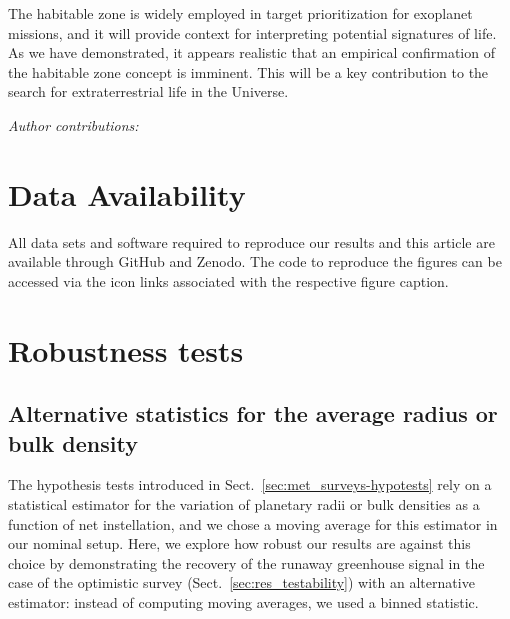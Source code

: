 \documentclass[twocolumn,twocolappendix]{aastex631}
\begin{document}
The habitable zone is widely employed in target prioritization for exoplanet missions, and it will provide context for interpreting potential signatures of life.
As we have demonstrated, it appears realistic that an empirical confirmation of the habitable zone concept is imminent.
This will be a key contribution to the search for extraterrestrial life in the Universe.


\begin{large}\textit{Author contributions:}\end{large}

\section*{Data Availability}
All data sets and software required to reproduce our results and this article are available through GitHub and Zenodo.
The code to reproduce the figures can be accessed via the icon links associated with the respective figure caption.




\appendix
\section{Robustness tests}
\subsection{Alternative statistics for the average radius or bulk density}\label{app:binnedstats}
The hypothesis tests introduced in Sect.~\ref{sec:met_surveys-hypotests} rely on a statistical estimator for the variation of planetary radii or bulk densities as a function of net instellation, and we chose a moving average for this estimator in our nominal setup.
Here, we explore how robust our results are against this choice by demonstrating the recovery of the runaway greenhouse signal in the case of the optimistic survey (Sect.~\ref{sec:res_testability}) with an alternative estimator: instead of computing moving averages, we used a binned statistic.
\end{document}
